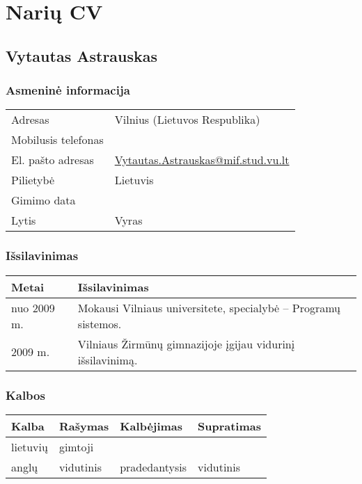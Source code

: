 \appendix
\chapter{Narių CV}

\section{Vytautas Astrauskas}

\subsection{Asmeninė informacija}

\begin{tabular}[]{p{3cm} | p{8cm}}
  Adresas & Vilnius (Lietuvos Respublika) \\
  Mobilusis telefonas & \\
  El. pašto adresas & \url{Vytautas.Astrauskas@mif.stud.vu.lt} \\
  Pilietybė & Lietuvis \\
  Gimimo data & \\
  Lytis & Vyras \\
\end{tabular}

\subsection{Išsilavinimas}

\begin{tabular}[]{p{3cm} | p{8cm}}
  Metai & Išsilavinimas \\
  \hline
  nuo 2009 m. & Mokausi Vilniaus universitete, 
    specialybė – Programų sistemos. \\
  2009 m. & Vilniaus Žirmūnų gimnazijoje įgijau vidurinį išsilavinimą.
\end{tabular}

\subsection{Kalbos}

\begin{tabular}[]{p{3cm} | p{2.5cm} p{2.5cm} p{2.0cm}}
  Kalba & Rašymas & Kalbėjimas & Supratimas \\
  \hline
  lietuvių & gimtoji && \\
  anglų & vidutinis & pradedantysis & vidutinis
\end{tabular}

